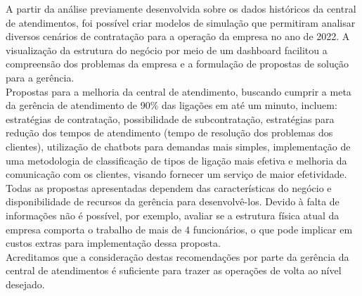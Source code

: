 A partir da análise previamente desenvolvida sobre os dados históricos da central de atendimentos, foi possível criar modelos de simulação que permitiram analisar diversos cenários de contratação para a operação da empresa no ano de 2022. A visualização da estrutura do negócio por meio de um dashboard facilitou a compreensão dos problemas da empresa e a formulação de propostas de solução para a gerência.\\
Propostas para a melhoria da central de atendimento, buscando cumprir a meta da gerência de atendimento de 90\% das ligações em até um minuto, incluem: estratégias de contratação, possibilidade de subcontratação, estratégias para redução dos tempos de atendimento (tempo de resolução dos problemas dos clientes), utilização de chatbots para demandas mais simples, implementação de uma metodologia de classificação de tipos de ligação mais efetiva e melhoria da comunicação com os clientes, visando fornecer um serviço de maior efetividade.\\
Todas as propostas apresentadas dependem das características do negócio e disponibilidade de recursos da gerência para desenvolvê-los. Devido à falta de informações não é possível, por exemplo, avaliar se a estrutura física atual da empresa comporta o trabalho de mais de 4 funcionários, o que pode implicar em custos extras para implementação dessa proposta.\\
Acreditamos que a consideração destas recomendações por parte da gerência da central de atendimentos é suficiente para trazer as operações de volta ao nível desejado.